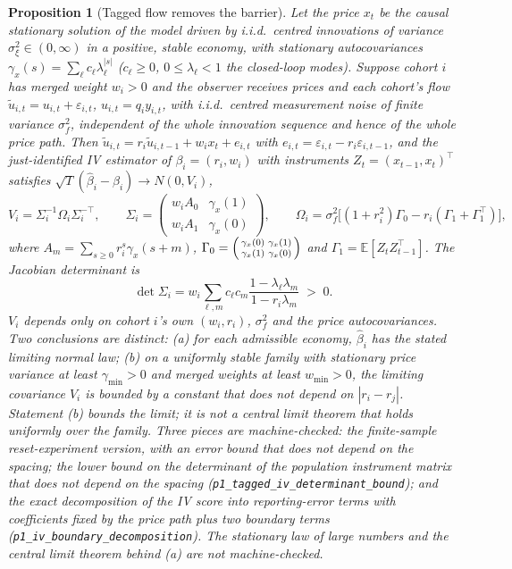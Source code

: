 \documentclass[12pt]{article}
\newtheorem{proposition}[theorem]{Proposition}
\theoremstyle{definition}
\theoremstyle{remark}
\newcommand{\E}{\mathbb{E}}
\begin{document}
\begin{proposition}[Tagged flow removes the barrier]\label{prop:tagged}
Let the price $x_t$ be the causal stationary solution of the model driven by i.i.d.\ centred innovations of variance $\sigma_\xi^2\in(0,\infty)$ in a positive, stable economy, with stationary autocovariances $\gamma_x(s)=\sum_\ell c_\ell\lambda_\ell^{|s|}$ ($c_\ell\ge0$, $0\le\lambda_\ell<1$ the closed-loop modes). Suppose cohort $i$ has merged weight $w_i>0$ and the observer receives prices and each cohort's flow $\tilde u_{i,t}=u_{i,t}+\varepsilon_{i,t}$, $u_{i,t}=q_iy_{i,t}$, with i.i.d.\ centred measurement noise of finite variance $\sigma_f^2$, independent of the whole innovation sequence and hence of the whole price path. Then $\tilde u_{i,t}=r_i\tilde u_{i,t-1}+w_ix_t+e_{i,t}$ with $e_{i,t}=\varepsilon_{i,t}-r_i\varepsilon_{i,t-1}$, and the just-identified IV estimator of $\beta_i=(r_i,w_i)$ with instruments $Z_t=(x_{t-1},x_t)^\top$ satisfies $\sqrt T(\hat\beta_i-\beta_i)\to N(0,V_i)$,
\begin{equation}\label{eq:ivvar}
V_i=\Sigma_i^{-1}\Omega_i\Sigma_i^{-\top},\qquad \Sigma_i=\begin{pmatrix}w_iA_0&\gamma_x(1)\\ w_iA_1&\gamma_x(0)\end{pmatrix},\qquad \Omega_i=\sigma_f^2\bigl[(1+r_i^2)\Gamma_0-r_i(\Gamma_1+\Gamma_1^\top)\bigr],
\end{equation}
where $A_m=\sum_{s\ge0}r_i^s\gamma_x(s+m)$, $\Gamma_0=\begin{psmallmatrix}\gamma_x(0)&\gamma_x(1)\\ \gamma_x(1)&\gamma_x(0)\end{psmallmatrix}$ and $\Gamma_1=\E[Z_tZ_{t-1}^\top]$. The Jacobian determinant is
\begin{equation}\label{eq:ivdet}
\det\Sigma_i=w_i\sum_{\ell,m}c_\ell c_m\frac{1-\lambda_\ell\lambda_m}{1-r_i\lambda_m}\;>\;0 .
\end{equation}
$V_i$ depends only on cohort $i$'s own $(w_i,r_i)$, $\sigma_f^2$ and the price autocovariances. Two conclusions are distinct: (a) for each admissible economy, $\hat\beta_i$ has the stated limiting normal law; (b) on a uniformly stable family with stationary price variance at least $\gamma_{\min}>0$ and merged weights at least $w_{\min}>0$, the limiting covariance $V_i$ is bounded by a constant that does not depend on $|r_i-r_j|$. Statement (b) bounds the limit; it is not a central limit theorem that holds uniformly over the family. Three pieces are machine-checked: the finite-sample reset-experiment version, with an error bound that does not depend on the spacing; the lower bound on the determinant of the population instrument matrix that does not depend on the spacing (\texttt{p1\_tagged\_iv\_determinant\_bound}); and the exact decomposition of the IV score into reporting-error terms with coefficients fixed by the price path plus two boundary terms (\texttt{p1\_iv\_boundary\_decomposition}). The stationary law of large numbers and the central limit theorem behind (a) are not machine-checked.
\end{proposition}
\end{document}

